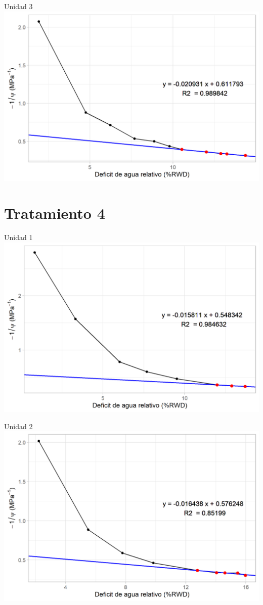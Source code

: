 \documentclass[
  letterpaper,
  DIV=11,
  numbers=noendperiod]{scrreprt}
\begin{document}
Unidad 3 \includegraphics{figuras/06_tlp/tlp_la_esperanza_T0_3.png}

\chapter{Tratamiento 4}

Unidad 1 \includegraphics{figuras/06_tlp/tlp_la_esperanza_T4_1.png}

Unidad 2 \includegraphics{figuras/06_tlp/tlp_la_esperanza_T4_2.png}
\end{document}
